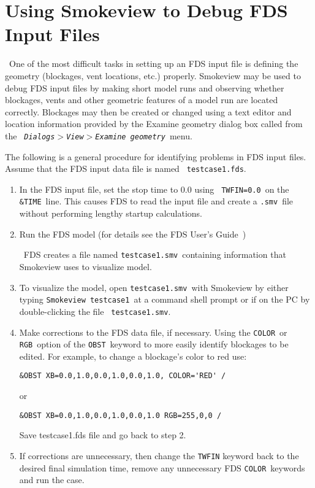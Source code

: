 \documentclass[11pt,twoside]{book}
\begin{document}


\chapter{Using Smokeview to Debug FDS Input Files}\ One of the most difficult
tasks in setting up an FDS input file is defining the geometry
(blockages, vent locations, etc.) properly. Smokeview may be used
to debug FDS input files by making short model runs and observing
whether blockages, vents and other geometric features of a model
run are located correctly. Blockages may then be created or
changed using a text editor and location information provided by
the Examine geometry dialog box called from the {\em \tt
Dialogs$>$View$>$Examine geometry}\ menu.

The following is a general procedure for identifying problems in
FDS input files. Assume that the FDS input data file is named {\tt
testcase1.fds}.
\begin{enumerate}
\item In the FDS input file, set the stop time to $0.0$ using {\tt
TWFIN=0.0}\ on the {\tt \&TIME}\ line. This causes FDS to read the
input file and create a {\tt .smv}\ file without  performing
lengthy startup calculations.

\item Run the FDS model (for details see the FDS User's
Guide~\cite{FDS_Users_Guide})

\noindent\ FDS creates a file named {\tt testcase1.smv}\ containing
information that Smokeview uses to visualize model.

\item To visualize the model, open {\tt testcase1.smv}\ with
Smokeview by either typing {\tt Smokeview testcase1}\ at a command
shell prompt or if on the PC by double-clicking the file {\tt
testcase1.smv}.

\item Make corrections to the FDS data file, if necessary. Using the {\tt COLOR}\ or {\tt
RGB}\ option of the
{\tt OBST}\ keyword to more easily identify blockages to be edited.
For example, to change a blockage's color to red use:
\begin{lstlisting}
&OBST XB=0.0,1.0,0.0,1.0,0.0,1.0, COLOR='RED' /
\end{lstlisting}
\noindent or
\begin{lstlisting}
&OBST XB=0.0,1.0,0.0,1.0,0.0,1.0 RGB=255,0,0 /
\end{lstlisting}

\noindent Save testcase1.fds file and go back to step 2.

\item If corrections are unnecessary, then change the {\tt TWFIN}
keyword back to the desired final simulation time, remove any
unnecessary FDS {\tt COLOR}\ keywords and run the case.
\end{enumerate}
\end{document}
